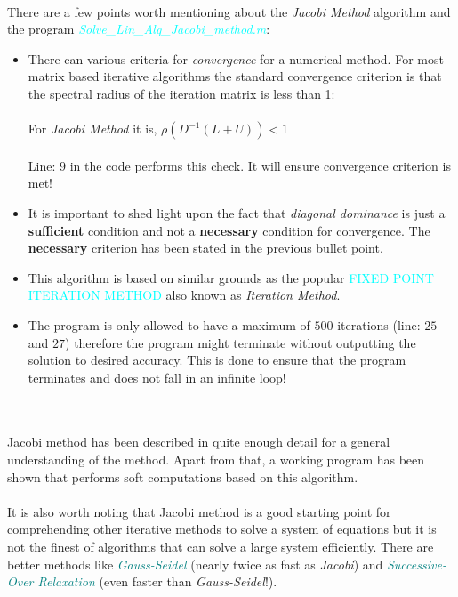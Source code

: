\documentclass[main]{subfiles}
\begin{document}
    
    \noindent{\Huge \textcolor{teal}{Discussions}} \\

    There are a few points worth mentioning about the \textit{Jacobi Method} algorithm and the program 
    \textcolor{cyan}{\textit{Solve\_Lin\_Alg\_Jacobi\_method.m}}:
    \\
    \begin{itemize}
        
        \item There can various criteria for \textit{convergence} for a numerical method. 
        For most matrix based iterative algorithms the standard convergence criterion is that the spectral radius of the iteration 
        matrix is less than 1:\\\\
        For \textit{Jacobi Method} it is,   
        $\rho \left( D^{-1} \left( L + U \right) \right) < 1$
        \\\\
        Line: {\small $9$} in the code performs this check. It will ensure convergence criterion is met! 


        \item It is important to shed light upon the fact that \textit{diagonal dominance} is just a 
        \textbf{sufficient} condition and not a \textbf{necessary} condition for convergence. The \textbf{necessary} criterion 
        has been stated in the previous bullet point.

        \item This algorithm is based on similar grounds as the popular \textcolor{cyan}{FIXED POINT ITERATION METHOD} 
        also known as \textit{Iteration Method}.

        \item The program is only allowed to have a maximum of $500$ iterations (line: $25$ and $27$) therefore the program might terminate without 
        outputting the solution to desired accuracy. This is done to ensure that the program terminates and does not fall in an infinite loop!
    \\

    \end{itemize}
    
    \noindent{\Huge \textcolor{teal}{Conclusion}} \\\\
    Jacobi method has been described in quite enough detail for a general understanding of the method. Apart from that, a working program has been shown that performs soft computations 
    based on this algorithm. \\\\
    It is also worth noting that Jacobi method is a good starting point for comprehending other iterative methods to solve a system of equations but it is not the finest 
        of algorithms that can solve a large system efficiently. There are better methods like \textcolor{teal}{\textit{Gauss-Seidel}} (nearly twice as fast as \textit{Jacobi}) and \textcolor{teal}{\textit{Successive-Over Relaxation}} (even faster than \textit{Gauss-Seidel}!). 
    
\end{document}
